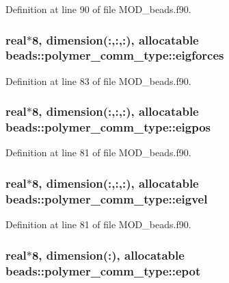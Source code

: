Definition at line 90 of file M\-O\-D\-\_\-beads.\-f90.

\hypertarget{structbeads_1_1polymer__comm__type_a8443614cb5015e9983dd6a6a8b8d730c}{
\subsubsection[{eigforces}]{\setlength{\rightskip}{0pt plus 5cm}real$\ast$8, dimension(\-:,\-:,\-:), allocatable beads\-::polymer\-\_\-comm\-\_\-type\-::eigforces}}\label{structbeads_1_1polymer__comm__type_a8443614cb5015e9983dd6a6a8b8d730c}


Definition at line 83 of file M\-O\-D\-\_\-beads.\-f90.

\hypertarget{structbeads_1_1polymer__comm__type_a48e8cc7efd08040fb11f7f4642fcbd3d}{
\subsubsection[{eigpos}]{\setlength{\rightskip}{0pt plus 5cm}real$\ast$8, dimension(\-:,\-:,\-:), allocatable beads\-::polymer\-\_\-comm\-\_\-type\-::eigpos}}\label{structbeads_1_1polymer__comm__type_a48e8cc7efd08040fb11f7f4642fcbd3d}


Definition at line 81 of file M\-O\-D\-\_\-beads.\-f90.

\hypertarget{structbeads_1_1polymer__comm__type_a5b453aa1870a35c3b1ce3e84b8e2c6cb}{
\subsubsection[{eigvel}]{\setlength{\rightskip}{0pt plus 5cm}real$\ast$8, dimension(\-:,\-:,\-:), allocatable beads\-::polymer\-\_\-comm\-\_\-type\-::eigvel}}\label{structbeads_1_1polymer__comm__type_a5b453aa1870a35c3b1ce3e84b8e2c6cb}


Definition at line 81 of file M\-O\-D\-\_\-beads.\-f90.

\hypertarget{structbeads_1_1polymer__comm__type_a729bf32d1b120205275265920cd5b3f9}{
\subsubsection[{epot}]{\setlength{\rightskip}{0pt plus 5cm}real$\ast$8, dimension(\-:), allocatable beads\-::polymer\-\_\-comm\-\_\-type\-::epot}}\label{structbeads_1_1polymer__comm__type_a729bf32d1b120205275265920cd5b3f9}


